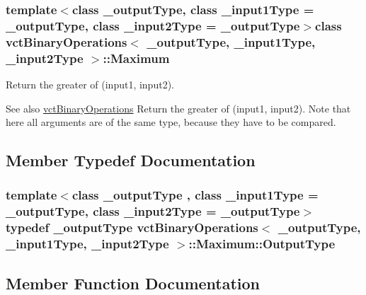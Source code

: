 \subsubsection*{template$<$class \+\_\+output\+Type, class \+\_\+input1\+Type = \+\_\+output\+Type, class \+\_\+input2\+Type = \+\_\+output\+Type$>$class vct\+Binary\+Operations$<$ \+\_\+output\+Type, \+\_\+input1\+Type, \+\_\+input2\+Type $>$\+::\+Maximum}

Return the greater of (input1, input2). 

\begin{DoxySeeAlso}{See also}
\hyperlink{classvct_binary_operations}{vct\+Binary\+Operations} Return the greater of (input1, input2). Note that here all arguments are of the same type, because they have to be compared. 
\end{DoxySeeAlso}


\subsection{Member Typedef Documentation}
\hypertarget{classvct_binary_operations_1_1_maximum_abfe4fd3b0f4c1b3dc210114bff1e92dc}{}
\subsubsection[{Output\+Type}]{\setlength{\rightskip}{0pt plus 5cm}template$<$class \+\_\+output\+Type , class \+\_\+input1\+Type  = \+\_\+output\+Type, class \+\_\+input2\+Type  = \+\_\+output\+Type$>$ typedef \+\_\+output\+Type {\bf vct\+Binary\+Operations}$<$ \+\_\+output\+Type, \+\_\+input1\+Type, \+\_\+input2\+Type $>$\+::{\bf Maximum\+::\+Output\+Type}}\label{classvct_binary_operations_1_1_maximum_abfe4fd3b0f4c1b3dc210114bff1e92dc}


\subsection{Member Function Documentation}
\hypertarget{classvct_binary_operations_1_1_maximum_ae66e4aca80b98858f63e15de140eb6b1}{}
